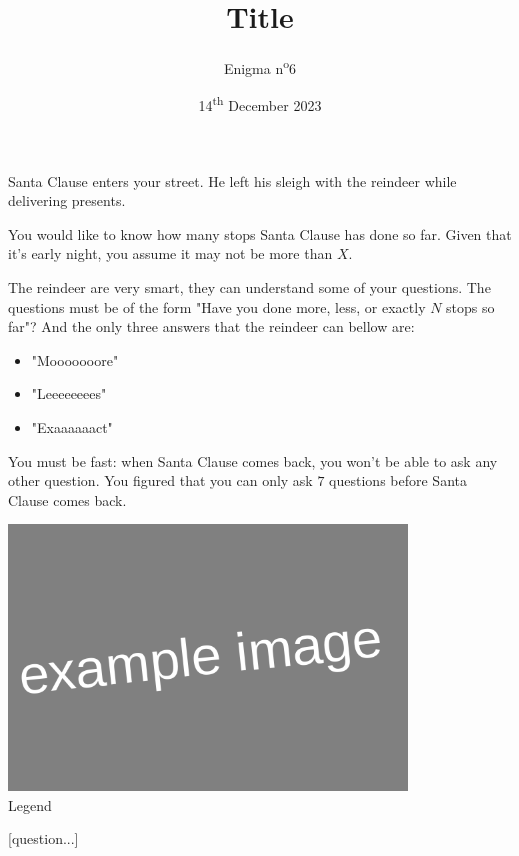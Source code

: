 \documentclass[a4paper, top=10mm]{article}
\title{\textbf{\huge{Title}}}
\author{Enigma n\textsuperscript{o}6}
\date{14\textsuperscript{th} December 2023}
\begin{document}
	\maketitle
	
	Santa Clause enters your street.
	He left his sleigh with the reindeer while delivering presents.
	
	You would like to know how many stops Santa Clause has done so far.
	Given that it's early night, you assume it may not be more than $X$.
	
	The reindeer are very smart, they can understand some of your questions.
	The questions must be of the form "Have you done more, less, or exactly $N$ stops so far"?
	And the only three answers that the reindeer can bellow are:
	\begin{itemize}
		\item "Mooooooore"
		\item "Leeeeeeees"
		\item "Exaaaaaact"
	\end{itemize}
	You must be fast: when Santa Clause comes back, you won't be able to ask any other question.
	You figured that you can only ask $7$ questions before Santa Clause comes back.
	
	\begin{center}
		\includegraphics[height=200pt]{00example.png}\\
		Legend
	\end{center}
	
	[question...]
	
\end{document}
